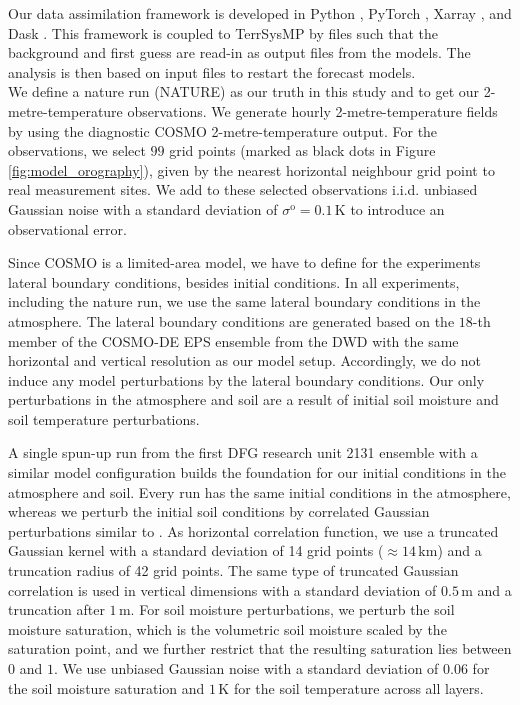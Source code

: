 \documentclass[hess, manuscript]{copernicus}
\begin{document}
Our data assimilation framework \citep{finn_torch-assimilate_2020} is developed in Python \citep{van_rossum_python_1995}, PyTorch \citep{paszke_pytorch_2019}, Xarray \citep{hoyer_xarray_2017}, and Dask \citep{dask_development_team_dask_2016,rocklin_dask_2015}.
This framework is coupled to TerrSysMP by files such that the background and first guess are read-in as output files from the models.
The analysis is then based on input files to restart the forecast models.\\

We define a nature run (NATURE) as our truth in this study and to get our 2-metre-temperature observations.
We generate hourly 2-metre-temperature fields by using the diagnostic COSMO 2-metre-temperature output. For the observations, we select $99$ grid points (marked as black dots in Figure \ref{fig:model_orography}), given by the nearest horizontal neighbour grid point to real measurement sites.
We add to these selected observations i.i.d. unbiased Gaussian noise with a standard deviation of $\sigma^\text{o} = 0.1\,\text{K}$ to introduce an observational error.

Since COSMO is a limited-area model, we have to define for the experiments lateral boundary conditions, besides initial conditions.
In all experiments, including the nature run, we use the same lateral boundary conditions in the atmosphere.
The lateral boundary conditions are generated based on the $18$-th member of the COSMO-DE EPS ensemble from the DWD with the same horizontal and vertical resolution as our model setup.
Accordingly, we do not induce any model perturbations by the lateral boundary conditions.
Our only perturbations in the atmosphere and soil are a result of initial soil moisture and soil temperature perturbations.

A single spun-up run from the first DFG research unit 2131 ensemble with a similar model configuration builds the foundation for our initial conditions in the atmosphere and soil.
Every run has the same initial conditions in the atmosphere, whereas we perturb the initial soil conditions by correlated Gaussian perturbations similar to \cite{schraff_kilometre-scale_2016}.
As horizontal correlation function, we use a truncated Gaussian kernel with a standard deviation of 14 grid points ($\approx 14 \,\text{km}$) and a truncation radius of 42 grid points.
The same type of truncated Gaussian correlation is used in vertical dimensions with a standard deviation of $0.5\,\text{m}$ and a truncation after $1\,\text{m}$.
For soil moisture perturbations, we perturb the soil moisture saturation, which is the volumetric soil moisture scaled by the saturation point, and we further restrict that the resulting saturation lies between $0$ and $1$.
We use unbiased Gaussian noise with a standard deviation of $0.06$ for the soil moisture saturation and $1\,\text{K}$ for the soil temperature across all layers.
\end{document}
